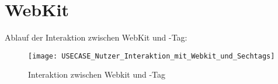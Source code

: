 \author{Gottfried von Recum}

\section{WebKit}

Ablauf der Interaktion zwischen WebKit und \SEARCH-Tag:
\begin{figure}[h]
    \centering
    \texttt{[image: USECASE\_Nutzer\_Interaktion\_mit\_Webkit\_und\_Sechtags]}
    \caption{Interaktion zwischen Webkit und \SEARCH-Tag}
    \label{fig:Webkit Use Case}
\end{figure}
